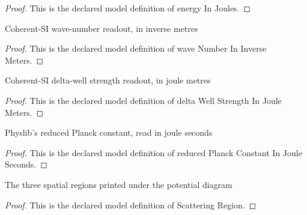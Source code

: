 \begin{proof}
  This is the declared model definition of energy In Joules.
\end{proof}
\begin{definition}
  \label{def:physics:phyx-mini-0601:phyxminiproblems-problemphyxmini0601-wavenumberininversemeters}
  Coherent-SI wave-number readout, in inverse metres
\end{definition}
\begin{proof}
  This is the declared model definition of wave Number In Inverse Meters.
\end{proof}
\begin{definition}
  \label{def:physics:phyx-mini-0601:phyxminiproblems-problemphyxmini0601-deltawellstrengthinjoulemeters}
  Coherent-SI delta-well strength readout, in joule metres
\end{definition}
\begin{proof}
  This is the declared model definition of delta Well Strength In Joule Meters.
\end{proof}
\begin{definition}
  \label{def:physics:phyx-mini-0601:phyxminiproblems-problemphyxmini0601-reducedplanckconstantinjouleseconds}
  Physlib's reduced Planck constant, read in joule seconds
\end{definition}
\begin{proof}
  This is the declared model definition of reduced Planck Constant In Joule Seconds.
\end{proof}
\begin{definition}
  \label{def:physics:phyx-mini-0601:phyxminiproblems-problemphyxmini0601-scatteringregion}
  The three spatial regions printed under the potential diagram
\end{definition}
\begin{proof}
  This is the declared model definition of Scattering Region.
\end{proof}
